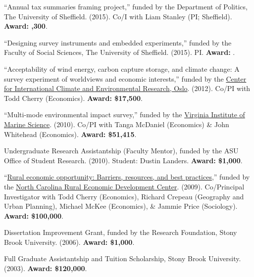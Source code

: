 \documentclass[12pt]{article}
\begin{document}
\begin{bibsection}
 		\item ``Annual tax summaries framing project,'' funded by the Department of Politics, 
	The University of Sheffield. (2015). Co\-/I with Liam Stanley (PI; Sheffield). \textbf{Award: ,300}.
	 
	\item ``Designing survey instruments and embedded experiments,'' 
	funded by the Faculty of Social Sciences, The University of Sheffield. (2015). PI. 
	\textbf{Award: }.
    
     \item ``Acceptability of wind energy, carbon capture storage, 
    and climate change: A survey experiment of worldviews and 
    economic interests,'' funded by 
    the \href{http://www.cicero.uio.no/}
    {Center for International Climate and Environmental Research, Oslo}. 
    (2012). Co\-/PI with Todd Cherry (Economics). \textbf{Award: \$17,500}.
    
     \item ``Multi-mode environmental impact survey,''
    funded by the \href{http://www.vims.edu/}
    {Virginia Institute of Marine Science}. (2010). Co\-/PI with Tanga McDaniel (Economics) \& John Whitehead (Economics). \textbf{Award: \$51,415}.
    
        \item Undergraduate Research Assistantship (Faculty Mentor), funded by the ASU Office of Student Research. (2010). Student: Dustin Landers. \textbf{Award: \$1,000}. 
    

    \item 
    ``\href{http://www.ncruralcenter.org/images/PDFs/ResearchInnovation/1_livingonmargins_aftermath_final.pdf}
    {Rural economic opportunity: Barriers, resources, and best practices},'' 
    funded by the \href{http://www.ncruralcenter.org/}
    {North Carolina Rural Economic Development Center}. (2009). Co\-/Principal Investigator with Todd Cherry (Economics), 
    Richard Crepeau (Geography and Urban Planning), 
    Michael McKee (Economics), \& Jammie Price (Sociology).  \textbf{Award: \$100,000}.
 
    	\item Dissertation Improvement Grant, funded by the Research Foundation, Stony Brook University. (2006). \textbf{Award: \$1,000}.
    
    	\item Full Graduate Assistantship and Tuition Scholarship, Stony Brook University. (2003).
	\textbf{Award: \$120,000}.
    

\end{bibsection}
\end{document}
